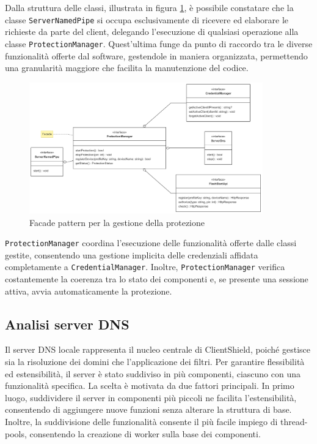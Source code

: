 \documentclass[12pt,a4paper,openright,twoside]{book}
\begin{document}
Dalla struttura delle classi, illustrata in figura \ref{fig:protezione-facade-pattern}, è possibile constatare che la classe \texttt{ServerNamedPipe} si occupa esclusivamente di ricevere ed elaborare le richieste da parte del client, delegando l'esecuzione di qualsiasi operazione alla classe \texttt{ProtectionManager}.
Quest'ultima funge da punto di raccordo tra le diverse funzionalità offerte dal software, gestendole in maniera organizzata, permettendo una granularità maggiore che facilita la manutenzione del codice.
\begin{figure}[h]
	\centering
	\includegraphics[width=0.9\textwidth]{figures/protezione-facade-pattern.png}
	\caption{Facade pattern per la gestione della protezione}
	\label{fig:protezione-facade-pattern}
\end{figure}
\texttt{ProtectionManager} coordina l'esecuzione delle funzionalità offerte dalle classi gestite, consentendo una gestione implicita delle credenziali affidata completamente a \texttt{CredentialManager}.
Inoltre, \texttt{ProtectionManager} verifica costantemente la coerenza tra lo stato dei componenti e, se presente una sessione attiva, avvia automaticamente la protezione.


\subsection{Analisi server DNS}
\label{ssec:analisi-server-dns}

Il server \gls{DNS} locale rappresenta il nucleo centrale di ClientShield, poiché gestisce sia la risoluzione dei domini che l'applicazione dei filtri.
Per garantire flessibilità ed estensibilità, il server è stato suddiviso in più componenti, ciascuno con una funzionalità specifica.
La scelta è motivata da due fattori principali.
In primo luogo, suddividere il server in componenti più piccoli ne facilita l'estensibilità, consentendo di aggiungere nuove funzioni senza alterare la struttura di base.
Inoltre, la suddivisione delle funzionalità consente il più facile impiego di thread-pools, consentendo la creazione di worker sulla base dei componenti.
\end{document}
